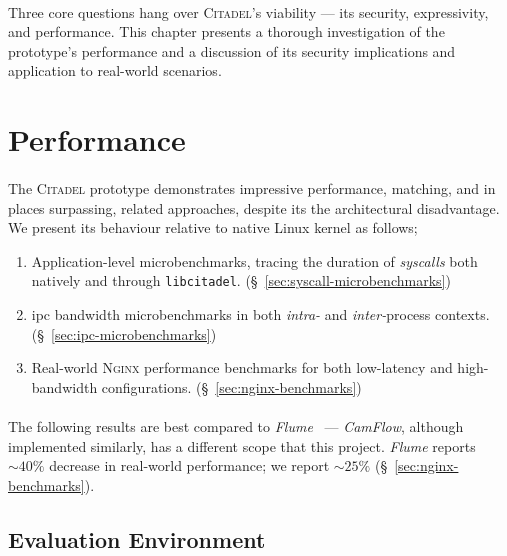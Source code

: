 \paragraph{} Three core questions hang over \textsc{Citadel}'s viability --- its security, expressivity, and performance. This chapter presents a thorough investigation of the prototype's performance and a discussion of its security implications and application to real-world scenarios.

\section{Performance}
\label{sec:performance}

\paragraph{} The \textsc{Citadel} prototype demonstrates impressive performance, matching, and in places surpassing, related approaches, despite its the architectural disadvantage. We present its behaviour relative to native Linux kernel as follows;

\begin{enumerate}
    \item Application-level microbenchmarks, tracing the duration of \textit{syscalls} both natively and through \texttt{libcitadel}. (§~\ref{sec:syscall-microbenchmarks})
    \item \acrshort{ipc} bandwidth microbenchmarks in both \textit{intra-} and \textit{inter-}process contexts. (§~\ref{sec:ipc-microbenchmarks})
    \item Real-world \textsc{Nginx} performance benchmarks for both low-latency and high-bandwidth configurations. (§~\ref{sec:nginx-benchmarks})
\end{enumerate}

\paragraph{} The following results are best compared to \textit{Flume}~\cite{flume} --- \textit{CamFlow}, although implemented similarly, has a different scope that this project. \textit{Flume} reports $\sim 40\%$ decrease in real-world performance; we report $\sim 25\%$ (§~\ref{sec:nginx-benchmarks}).

\subsection{Evaluation Environment}
